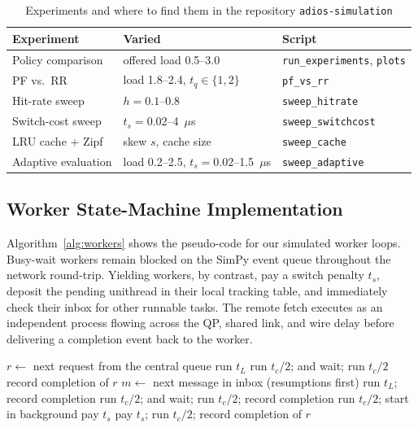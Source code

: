 \begin{table}[t]
\caption{Experiments and where to find them in the repository \texttt{adios-simulation}}
\label{tab:experiments}
\centering
\footnotesize
\begin{tabular}{p{2.5cm}p{2.6cm}p{2.0cm}}
\toprule
Experiment & Varied & Script \\
\midrule
Policy comparison & offered load 0.5--3.0 & \texttt{run\_experiments}, \texttt{plots} \\
PF vs.\ RR & load 1.8--2.4, $t_q\in\{1,2\}$ & \texttt{pf\_vs\_rr} \\
Hit-rate sweep & $h=0.1$--0.8 & \texttt{sweep\_hitrate} \\
Switch-cost sweep & $t_s=0.02$--4~$\mu$s & \texttt{sweep\_switchcost} \\
LRU cache + Zipf & skew $s$, cache size & \texttt{sweep\_cache} \\
Adaptive evaluation & load 0.2--2.5, $t_s=0.02$--1.5~$\mu$s & \texttt{sweep\_adaptive} \\
\bottomrule
\end{tabular}
\end{table}

\subsection{Worker State-Machine Implementation}
Algorithm~\ref{alg:workers} shows the pseudo-code for our simulated worker loops. Busy-wait workers remain blocked on the SimPy event queue throughout the network round-trip. Yielding workers, by contrast, pay a switch penalty $t_s$, deposit the pending unithread in their local tracking table, and immediately check their inbox for other runnable tasks. The remote fetch executes as an independent process flowing across the QP, shared link, and wire delay before delivering a completion event back to the worker.

\begin{algorithm}[t]
\caption{Worker behaviour in the simulator.}
\label{alg:workers}
\begin{algorithmic}[1]
\small
{}
\Loop
\State $r \gets$ next request from the central queue
 \State run $t_L$
\Else \State run $t_c/2$; \;  and wait; \; run $t_c/2$
\EndIf
\State record completion of $r$
\EndLoop
\EndProcedure
{}
\Loop
\State $m \gets$ next message in inbox (resumptions first)
 \State run $t_L$; \; record completion
 
\State run $t_c/2$; \;  and wait; \; run $t_c/2$; \; record completion
\Else
\State run $t_c/2$; \; start  in background
\State pay $t_s$ 
\EndIf
\Else {}
\State pay $t_s$; \; run $t_c/2$; \; record completion of $r$
\EndIf
\EndLoop
\EndProcedure
\end{algorithmic}
\end{algorithm}

